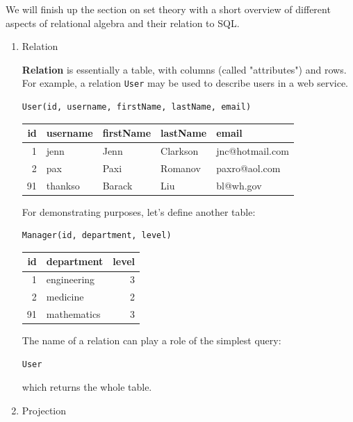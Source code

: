 \documentclass[12pt, a4paper, justified, notitlepage, sfsidenotes, notoc]{book}
\begin{document}
We will finish up the section on set theory with a short overview of different aspects of relational algebra and their relation to SQL.

\begin{enumerate}
\item Relation
\label{sec:org9ba77e4}

\textbf{\textbf{Relation}} is essentially a table, with columns (called "attributes") and rows. For example, a relation \texttt{User} may be used to describe users in a web service.

\begin{verbatim}
User(id, username, firstName, lastName, email)
\end{verbatim}

\begin{center}
\begin{tabular}{rllll}
id & username & firstName & lastName & email\\
\hline
1 & jenn & Jenn & Clarkson & jnc@hotmail.com\\
2 & pax & Paxi & Romanov & paxro@aol.com\\
91 & thankso & Barack & Liu & bl@wh.gov\\
\end{tabular}
\end{center}

For demonstrating purposes, let's define another table:

\begin{verbatim}
Manager(id, department, level)
\end{verbatim}

\begin{center}
\begin{tabular}{rlr}
id & department & level\\
\hline
1 & engineering & 3\\
2 & medicine & 2\\
91 & mathematics & 3\\
\end{tabular}
\end{center}

The name of a relation can play a role of the simplest query:

\begin{verbatim}
User
\end{verbatim}

which returns the whole table.

\item Projection
\label{sec:org0e8f5e9}


\end{enumerate}
\end{document}
